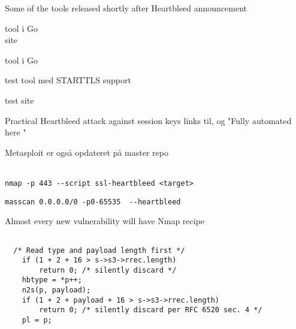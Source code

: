\documentclass[Screen16to9,17pt]{foils}
\begin{document}
\centerline{Some of the tools released shortly after Heartbleed announcement}
\begin{list2}
\item {} tool i Go\\
site 
\item {} tool i Go
\item {} test tool med STARTTLS support
\item {} test site
\item {} Practical Heartbleed attack against session keys links til,  og "Fully automated here "\\ 

\item Metasploit er også opdateret på master repo\\ \\
\end{list2}




\begin{list1}
\item \verb+nmap -p 443 --script ssl-heartbleed <target>+\\
\item \verb+masscan 0.0.0.0/0 -p0-65535  --heartbleed+\\
\end{list1}

\centerline{Almost every new vulnerability will have Nmap recipe}


\begin{verbatim}

  /* Read type and payload length first */
    if (1 + 2 + 16 > s->s3->rrec.length)
        return 0; /* silently discard */
    hbtype = *p++;
    n2s(p, payload);
    if (1 + 2 + payload + 16 > s->s3->rrec.length)
        return 0; /* silently discard per RFC 6520 sec. 4 */
    pl = p;
\end{verbatim}
\end{document}
